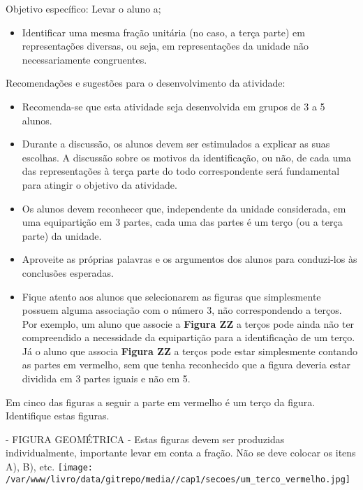 \documentclass[a4paper,12pt,twoside]{book}
\begin{document}
\begin{professor*}[breakable]{}{}     
  Objetivo específico: Levar o aluno a;  
  
\begin{itemize} %
    \item       Identificar uma mesma fração unitária (no caso, a terça parte) em representações diversas, ou seja, em representações da unidade não necessariamente congruentes.
\end{itemize} %
  
     
  
  Recomendações e sugestões para o desenvolvimento da atividade:  
\begin{itemize} %
    \item       Recomenda-se que esta atividade seja desenvolvida em grupos de 3 a 5 alunos.
    \item       Durante a discussão, os alunos devem ser estimulados a explicar as suas escolhas. A discussão sobre os motivos da identificação, ou não, de cada uma das representações à terça parte do todo correspondente será fundamental para atingir o objetivo da atividade.
    \item       Os alunos devem reconhecer que, independente da unidade considerada, em uma equipartição em 3 partes, cada uma das partes é um terço (ou a terça parte) da unidade.
    \item       Aproveite as próprias palavras e os argumentos dos alunos para conduzi-los às conclusões esperadas.
    \item       Fique atento aos alunos que selecionarem as figuras que simplesmente possuem alguma associação com o número 3, não correspondendo a terços. Por exemplo, um aluno que associe a       {\bf Figura ZZ}       a terços pode ainda não ter compreendido a necessidade da equipartição para a identificaçào de um terço. Já o aluno que associa       {\bf Figura ZZ}       a terços pode estar simplesmente contando as partes em vermelho, sem que tenha reconhecido que a figura deveria estar dividida em 3 partes iguais e não em 5. 
\end{itemize} %
  
\end{professor*}



Em cinco das figuras a seguir a parte em vermelho é um terço da figura. Identifique estas figuras.
\begin{imagem*}[breakable]{}{}   - FIGURA GEOMÉTRICA - Estas figuras devem ser produzidas individualmente, importante levar em conta a fração. Não se deve colocar os itens A), B), etc.  
    \texttt{[image: /var/www/livro/data/gitrepo/media//cap1/secoes/um\_terco\_vermelho.jpg]}  
\end{imagem*}
\end{document}
